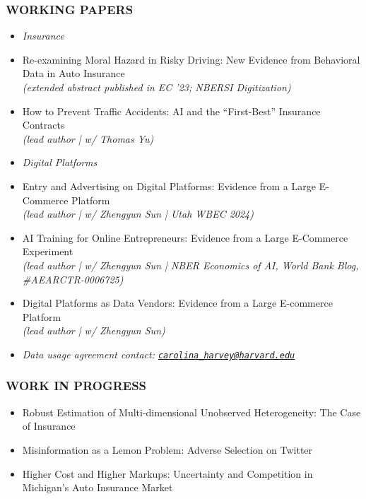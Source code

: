 \vspace{0.05cm}
\subsubsection*{WORKING PAPERS}
\begin{itemize}
\setlength{\itemindent}{-.1in}
\item \textit{Insurance}
\item Re-examining Moral Hazard in Risky Driving: New Evidence from Behavioral Data in Auto Insurance \\
\textit{(extended abstract published in EC '23; NBERSI Digitization)}
\item How to Prevent Traffic Accidents: AI and the ``First-Best'' Insurance Contracts \\
\textit{(lead author | w/ Thomas Yu)}
\item \textit{Digital Platforms}
\item Entry and Advertising on Digital Platforms: Evidence from a Large E-Commerce Platform\\
\textit{(lead author | w/ Zhengyun Sun | Utah WBEC 2024)}
\item AI Training for Online Entrepreneurs: Evidence from a Large E-Commerce Experiment\\
\textit{(lead author | w/ Zhengyun Sun | NBER Economics of AI, World Bank Blog, \#AEARCTR-0006725)}
\item Digital Platforms as Data Vendors: Evidence from a Large E-commerce Platform \\
\textit{(lead author | w/ Zhengyun Sun)}
\item \textit{Data usage agreement contact: \href{mailto:carolina_harvey@harvard.edu}{\tt carolina\_harvey@harvard.edu}}
\end{itemize}

\vspace{0.05cm}
\subsubsection*{WORK IN PROGRESS}
\begin{itemize}
\item Robust Estimation of Multi-dimensional Unobserved Heterogeneity: The Case of Insurance
\item Misinformation as a Lemon Problem: Adverse Selection on Twitter
\item Higher Cost and Higher Markups: Uncertainty and Competition in Michigan's Auto Insurance Market
\end{itemize}


